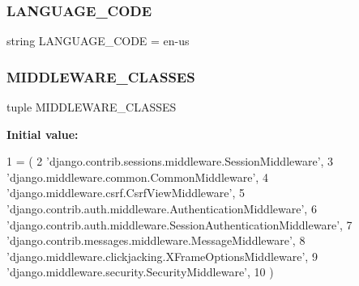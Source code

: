 \subsubsection{\texorpdfstring{L\+A\+N\+G\+U\+A\+G\+E\+\_\+\+C\+O\+DE}{LANGUAGE\_CODE}}
{\footnotesize\ttfamily string L\+A\+N\+G\+U\+A\+G\+E\+\_\+\+C\+O\+DE = \textquotesingle{}en-\/us\textquotesingle{}}

\mbox{\label{namespacedynamicfiltersite_1_1settings_a625748b6f9b2b18184a1f5447b74d728}} 
\subsubsection{\texorpdfstring{M\+I\+D\+D\+L\+E\+W\+A\+R\+E\+\_\+\+C\+L\+A\+S\+S\+ES}{MIDDLEWARE\_CLASSES}}
{\footnotesize\ttfamily tuple M\+I\+D\+D\+L\+E\+W\+A\+R\+E\+\_\+\+C\+L\+A\+S\+S\+ES}

{\bfseries Initial value\+:}
\begin{DoxyCode}
1 =  (
2     \textcolor{stringliteral}{'django.contrib.sessions.middleware.SessionMiddleware'},
3     \textcolor{stringliteral}{'django.middleware.common.CommonMiddleware'},
4     \textcolor{stringliteral}{'django.middleware.csrf.CsrfViewMiddleware'},
5     \textcolor{stringliteral}{'django.contrib.auth.middleware.AuthenticationMiddleware'},
6     \textcolor{stringliteral}{'django.contrib.auth.middleware.SessionAuthenticationMiddleware'},
7     \textcolor{stringliteral}{'django.contrib.messages.middleware.MessageMiddleware'},
8     \textcolor{stringliteral}{'django.middleware.clickjacking.XFrameOptionsMiddleware'},
9     \textcolor{stringliteral}{'django.middleware.security.SecurityMiddleware'},
10 )
\end{DoxyCode}
\mbox{\label{namespacedynamicfiltersite_1_1settings_a4b4f0b801c1d1b0fee67c8f45391ffb1}} 
